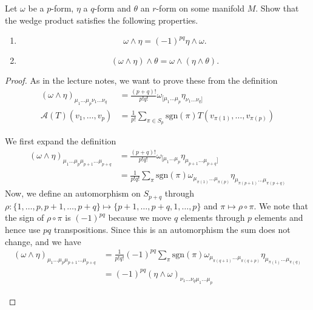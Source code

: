 \begin{Problem}

Let $\omega$ be a $p$-form, $\eta$ a $q$-form and $\theta$ an $r$-form on some manifold $M$. Show that the wedge product satisfies the following properties.

\begin{enumerate}
\item[(a)]
\[
\omega \wedge \eta = (-1)^{pq}\eta \wedge \omega.
\]

\item[(b)]
\[
(\omega \wedge \eta)\wedge\theta
=
\omega\wedge(\eta\wedge\theta).
\]
\end{enumerate}

\end{Problem}
\begin{proof}
As in the lecture notes, we want to prove these from the definition
\begin{align*}
	(\omega\wedge \eta)_{\mu_1\dots \mu_p \nu_1\dots \nu_q} &= \frac{(p+q)!}{p!q!}\omega_{[\mu_1\dots \mu_p}\eta_{\nu_1\dots\nu_q]} \\
	\mathcal{A}(T)(v_1,\dots,v_p)&= \frac{1}{p!}\sum_{\pi\in S_p}\text{sgn}(\pi)T(v_{\pi(1)},\dots, v_{\pi(p)}) 
\end{align*}
	\begin{parts}
	\item We first expand the definition
	\begin{align*}
		(\omega\wedge \eta)_{\mu_1\dots \mu_p \mu_{p+1}\dots \mu_{p+q}} &= \frac{(p+q)!}{p!q!}\omega_{[\mu_1\dots \mu_p}\eta_{\mu_{p+1}\dots \mu_{p+q}]} \\
				&= \frac{1}{p!q!}\sum_\pi \text{sgn}(\pi)\omega_{\mu_{\pi(1)}\dots \mu_{\pi(p)}}\eta_{\mu_{\pi(p+1)}\dots \mu_{\pi(p+q)}}
	\end{align*}
	Now, we define an automorphism on $S_{p+q}$ through $\rho: \{1,\dots, p, p+1, \dots, p+q\} \mapsto \{p+1, \dots, p+q, 1, \dots, p\} $ and $\pi \mapsto \rho\circ \pi$. We note that the sign of $\rho \circ \pi$ is $(-1)^{pq}$ because we move $q$ elements through $p$ elements and hence use $pq$ transpositions. Since this is an automorphism the sum does not change, and we have
	\begin{align*}
		(\omega\wedge \eta)_{\mu_1\dots \mu_p \mu_{p+1}\dots \mu_{p+q}} &= \frac{1}{p!q!}(-1)^{pq}\sum_\pi \text{sgn}(\pi)\omega_{\mu_{\pi(q+1)}\dots \mu_{\pi(q+p)}}\eta_{\mu_{\pi(1)}\dots\mu_{\pi(q)}}\\
		&= (-1)^{pq}(\eta\wedge\omega)_{\nu_1\dots \nu_q \mu_1 \dots \mu_p} 

\end{align*}
\end{parts}
\end{proof}
